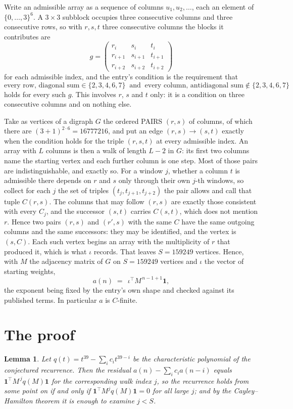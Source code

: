\documentclass[11pt,a4paper]{article}
\theoremstyle{plain}
\newtheorem{lemma}[theorem]{Lemma}
\theoremstyle{definition}
\begin{document}
Write an admissible array as a sequence of columns $u_1,u_2,\dots$, each an element of
$\{0,\dots,3\}^{6}$. A $3\times3$ subblock occupies three consecutive columns and
three consecutive rows, so with $r,s,t$ three consecutive columns the blocks it
contributes are
\[
g=\begin{pmatrix}r_i&s_i&t_i\\ r_{i+1}&s_{i+1}&t_{i+1}\\ r_{i+2}&s_{i+2}&t_{i+2}\end{pmatrix}
\]
for each admissible index, and the entry's condition is the requirement that
\[
\text{every row, diagonal sum} \in \{2,3,4,6,7\}\ \text{ and }\ \text{every column, antidiagonal sum} \notin \{2,3,4,6,7\}
\]
holds for every such $g$. This involves $r$, $s$ and $t$ only: it is a condition on
three consecutive columns and on nothing else.

Take as vertices of a digraph $G$ the ordered PAIRS $(r,s)$ of columns, of which there are
$(3+1)^{2\cdot6}=16777216$, and put an edge $(r,s)\to(s,t)$ exactly when the condition
holds for the triple $(r,s,t)$ at every admissible index. An array with $L$ columns is then a
walk of length $L-2$ in $G$: its first two columns name the starting vertex and each further
column is one step. Most of those pairs are indistinguishable, and exactly so. For a window $j$, whether a column $t$ is admissible there depends on $r$ and $s$ only through their own $j$-th windows, so collect for each $j$ the set of triples $(t_j,t_{j+1},t_{j+2})$ the pair allows and call that tuple $C(r,s)$. The columns that may follow $(r,s)$ are exactly those consistent with every $C_j$, and the successor $(s,t)$ carries $C(s,t)$, which does not mention $r$. Hence two pairs $(r,s)$ and $(r',s)$ with the same $C$ have the same outgoing columns and the same successors: they may be identified, and the vertex is $(s,C)$. Each such vertex begins an array with the multiplicity of $r$ that produced it, which is what $\iota$ records. That leaves $S=159249$ vertices. Hence, with $M$ the adjacency matrix of $G$ on $S=159249$ vertices and
$\iota$ the vector of starting weights,
\[
a(n)\;=\;\,\iota^{\!\top}M^{\,n-1+1}\mathbf{1},
\]
the exponent being fixed by the entry's own shape and checked against its published terms.
In particular $a$ is $C$-finite.

\section{The proof}

\begin{lemma}\label{lem:crit}
Let $q(t)=t^{39}-\sum_i c_it^{39-i}$ be the characteristic polynomial of the
conjectured recurrence. Then the residual $a(n)-\sum_ic_ia(n-i)$ equals
$\mathbf{1}^{\!\top}M^{\,j}q(M)\mathbf{1}$ for the corresponding walk index
$j$, so the recurrence holds from some point on if and only if
$\mathbf{1}^{\!\top}M^{j}q(M)\mathbf{1}=0$ for all large $j$; and by the
Cayley--Hamilton theorem it is enough to examine $j<S$.
\end{lemma}
\end{document}
